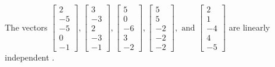 \begin{exercise}
\begin{exerciseStatement}
  \end{exerciseStatement}
  \begin{exerciseAnswer}
   The vectors \(\left[\begin{array}{r}
2 \\
-5 \\
-5 \\
0 \\
-1
\end{array}\right] , \left[\begin{array}{r}
3 \\
-3 \\
2 \\
-3 \\
-1
\end{array}\right] , \left[\begin{array}{r}
5 \\
0 \\
-6 \\
3 \\
-2
\end{array}\right] , \left[\begin{array}{r}
5 \\
5 \\
-2 \\
-2 \\
-2
\end{array}\right] , \text{ and } \left[\begin{array}{r}
2 \\
1 \\
-4 \\
4 \\
-5
\end{array}\right]\) are 
  	 linearly independent  .
  


  \end{exerciseAnswer}
\end{exercise}